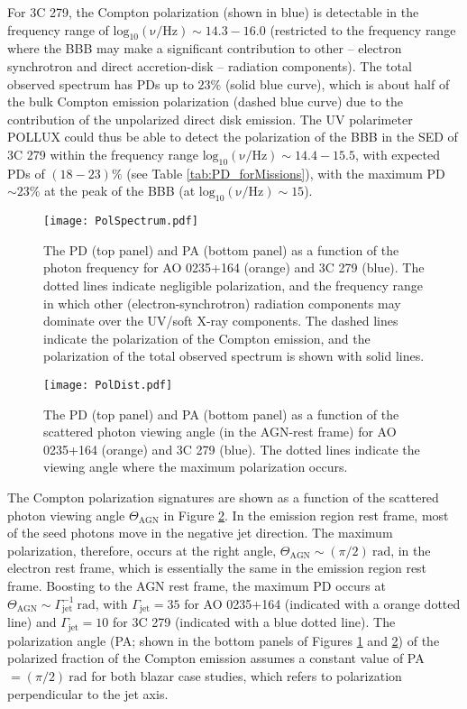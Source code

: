 \documentclass[twocolumn, tighten, twocolappendix]{aastex63}
\begin{document}
For 3C 279, the Compton polarization (shown in blue) is detectable in the frequency range of $\mathrm{log_{10}(\nu/ Hz)}\sim 14.3 - 16.0$ (restricted to the frequency range where the BBB may make a significant contribution to other -- electron synchrotron and direct accretion-disk -- radiation components).  The total observed spectrum has PDs up to $23 \%$ (solid blue curve), which is about half of the bulk Compton emission polarization (dashed blue curve) due to the contribution of the unpolarized direct disk emission. The UV polarimeter POLLUX could thus be able to detect the polarization of the BBB in the SED of 3C 279 within the frequency range $\mathrm{log_{10}(\nu/ Hz)}\sim 14.4 - 15.5$, with expected PDs of $(18 - 23)\%$ (see Table \ref{tab:PD_forMissions}), with the maximum PD $\sim 23\%$ at the peak of the BBB (at $\mathrm{log_{10}(\nu/ Hz)}\sim 15$). 

\begin{figure}[ht!]
\texttt{[image: PolSpectrum.pdf]}
\caption{The PD (top panel) and PA (bottom panel) as a function of the photon frequency for AO 0235+164 (orange) and 3C 279 (blue). The dotted lines indicate negligible polarization, and the frequency range in which other (electron-synchrotron) radiation components may dominate over the UV/soft X-ray components. The dashed lines indicate the polarization of the Compton emission, and the polarization of the total observed spectrum is shown with solid lines. \label{fig:PDSpectra}}
\end{figure}
\begin{figure}[ht!]
\texttt{[image: PolDist.pdf]}
\caption{The PD (top panel) and PA (bottom panel) as a function of the scattered photon viewing angle (in the AGN-rest frame) for AO 0235+164 (orange) and 3C 279 (blue). The dotted lines indicate the viewing angle where the maximum polarization occurs. \label{fig:PDDist}}
\end{figure}
The Compton polarization signatures are shown as a function of the scattered photon viewing angle $\Theta_{\mathrm{AGN}}$ in Figure \ref{fig:PDDist}. In the emission region rest frame, most of the seed photons move in the negative jet direction. The maximum polarization, therefore, occurs at the right angle, $\Theta_{\mathrm{AGN}} \sim (\pi/2) ~\mathrm{rad}$, in the electron rest frame, which is essentially the same in the emission region rest frame. Boosting to the AGN rest frame, the maximum PD occurs at $\Theta_{\mathrm{AGN}} \sim \Gamma_{\mathrm{jet}}^{-1} ~\mathrm{rad}$, with $\Gamma_{\mathrm{jet}} = 35$ for AO 0235+164 (indicated with a orange dotted line) and $\Gamma_{\mathrm{jet}} = 10$ for 3C 279 (indicated with a blue dotted line). The polarization angle (PA; shown in the bottom panels of Figures \ref{fig:PDSpectra} and \ref{fig:PDDist}) of the polarized fraction of the Compton emission assumes a constant value of PA $= (\pi/2) ~\mathrm{rad}$ for both blazar case studies, which refers to polarization perpendicular to the jet axis.
\end{document}
